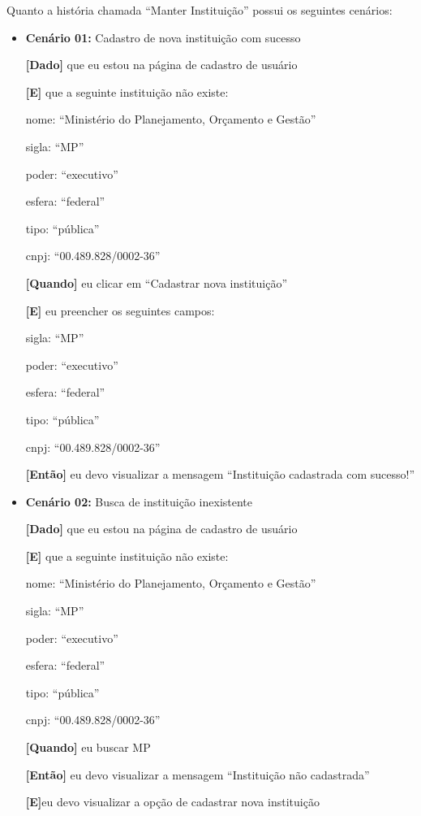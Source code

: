      Quanto a história chamada ``Manter Instituição''  possui os seguintes cenários:

\begin{itemize}
\item\textbf{Cenário 01:} Cadastro de nova instituição com sucesso

\textbf{[Dado]} que eu estou na página de cadastro de usuário

\textbf{[E]} que a seguinte instituição não existe:

    \subitem nome: ``Ministério do Planejamento, Orçamento e Gestão''

    \subitem sigla: ``MP''

    \subitem poder: ``executivo''

    \subitem esfera: ``federal''

    \subitem tipo: ``pública''

    \subitem cnpj: ``00.489.828/0002-36''

\textbf{[Quando]} eu clicar em ``Cadastrar nova instituição''

\textbf{[E]} eu preencher os seguintes campos:

    \subitem sigla: ``MP''

    \subitem poder: ``executivo''

    \subitem esfera: ``federal''

    \subitem tipo: ``pública''

    \subitem cnpj: ``00.489.828/0002-36''

\textbf{[Então]} eu devo visualizar a mensagem ``Instituição cadastrada com sucesso!''

\item\textbf{Cenário 02:} Busca de instituição inexistente

\textbf{[Dado]} que eu estou na página de cadastro de usuário

\textbf{[E]} que a seguinte instituição não existe:

 \subitem nome: ``Ministério do Planejamento, Orçamento e Gestão''

  \subitem sigla: ``MP''

  \subitem poder: ``executivo''

  \subitem esfera: ``federal''

  \subitem tipo: ``pública''
  
  \subitem cnpj: ``00.489.828/0002-36''

\textbf{[Quando]} eu buscar MP

\textbf{[Então]} eu devo visualizar a mensagem ``Instituição não cadastrada''

\textbf{[E]}eu devo visualizar a opção de cadastrar nova instituição
\end{itemize}

